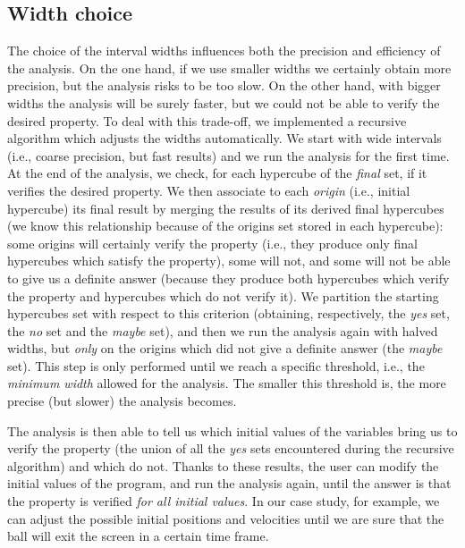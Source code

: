 \subsection{Width choice} \label{sec:widths}
\vspace{-5pt}
The choice of the interval widths influences both the precision and efficiency of the analysis. On the one hand, if we use smaller widths we certainly obtain more precision, but the analysis risks to be too slow. On the other hand, with bigger widths the analysis will be surely faster, but we could not be able to verify the desired property. To deal with this trade-off, we implemented a recursive algorithm which adjusts the widths automatically.
We start with wide intervals (i.e., coarse precision, but fast results) and we run the analysis for the first time. At the end of the analysis, we check, for each hypercube of the \emph{final} set, if it verifies the desired property. We then associate to each \emph{origin} (i.e., initial hypercube) its final result by merging the results of its derived final hypercubes (we know this relationship because of the origins set stored in each hypercube): some origins will certainly verify the property (i.e., they produce only final hypercubes which satisfy the property), some will not, and some will not be able to give us a definite answer (because they produce both hypercubes which verify the property and hypercubes which do not verify it). We partition the starting hypercubes set with respect to this criterion (obtaining, respectively, the \emph{yes} set, the \emph{no} set and the \emph{maybe} set), and then we run the analysis again with halved widths, but \emph{only} on the origins which did not give a definite answer (the \emph{maybe} set). This step is only performed until we reach a specific threshold, i.e., the \textit{minimum width} allowed for the analysis. The smaller this threshold is, the more precise (but slower) the analysis becomes.

The analysis is then able to tell us which initial values of the variables bring us to verify the property (the union of all the \emph{yes} sets encountered during the recursive algorithm) and which do not. Thanks to these results, the user can modify the initial values of the program, and run the analysis again, until the answer is that the property is verified \emph{for all initial values}. In our case study, for example, we can adjust the possible initial positions and velocities until we are sure that the ball will exit the screen in a certain time frame. 

